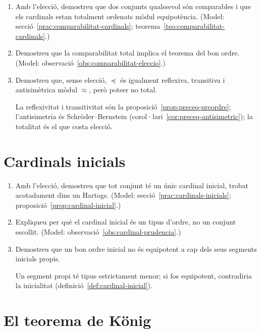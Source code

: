 \begin{enumerate}[resume]
  \item Amb l'elecció, demostreu que dos conjunts qualssevol són comparables i que els cardinals estan totalment ordenats mòdul equipotència. (Model: secció~\ref{prac:comparabilitat-cardinals}; teorema~\ref{teo:comparabilitat-cardinals}.)

  \item Demostreu que la comparabilitat total implica el teorema del bon ordre. (Model: observació~\ref{obs:comparabilitat-eleccio}.)

  \item Demostreu que, sense elecció, \(\preceq\) és igualment reflexiva, transitiva i antisimètrica mòdul \(\approx\), però potser no total. \begin{indicacio}La reflexivitat i transitivitat són la proposició~\ref{prop:preceq-preordre}; l'antisimetria és Schröder--Bernstein (corol·lari~\ref{cor:preceq-antisimetric}); la totalitat és el que costa elecció.\end{indicacio}
\end{enumerate}

\section{Cardinals inicials}

\begin{enumerate}[resume]
  \item Amb l'elecció, demostreu que tot conjunt té un únic cardinal inicial, trobat acotadament dins un Hartogs. (Model: secció~\ref{prac:cardinals-inicials}; proposició~\ref{prop:cardinal-inicial}.)

  \item Expliqueu per què el cardinal inicial és un tipus d'ordre, no un conjunt escollit. (Model: observació~\ref{obs:cardinal-prudencia}.)

  \item Demostreu que un bon ordre inicial no és equipotent a cap dels seus segments inicials propis. \begin{indicacio}Un segment propi té tipus estrictament menor; si fos equipotent, contradiria la inicialitat (definició~\ref{def:cardinal-inicial}).\end{indicacio}
\end{enumerate}

\section{El teorema de König}

